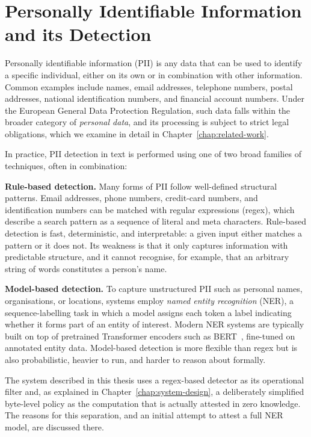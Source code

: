 \section{Personally Identifiable Information and its Detection}
\label{sec:bg-pii}

Personally identifiable information (PII) is any data that can be used to identify a specific individual, either on its own or in combination with other information. Common examples include names, email addresses, telephone numbers, postal addresses, national identification numbers, and financial account numbers. Under the European General Data Protection Regulation, such data falls within the broader category of \emph{personal data}, and its processing is subject to strict legal obligations, which we examine in detail in Chapter~\ref{chap:related-work}.

\medskip

In practice, PII detection in text is performed using one of two broad families of techniques, often in combination:

\medskip

\textbf{Rule-based detection.} Many forms of PII follow well-defined structural patterns. Email addresses, phone numbers, credit-card numbers, and identification numbers can be matched with regular expressions (regex), which describe a search pattern as a sequence of literal and meta characters. Rule-based detection is fast, deterministic, and interpretable: a given input either matches a pattern or it does not. Its weakness is that it only captures information with predictable structure, and it cannot recognise, for example, that an arbitrary string of words constitutes a person's name.

\medskip

\textbf{Model-based detection.} To capture unstructured PII such as personal names, organisations, or locations, systems employ \emph{named entity recognition} (NER), a sequence-labelling task in which a model assigns each token a label indicating whether it forms part of an entity of interest. Modern NER systems are typically built on top of pretrained Transformer encoders such as BERT~\cite{devlin2019bert}, fine-tuned on annotated entity data. Model-based detection is more flexible than regex but is also probabilistic, heavier to run, and harder to reason about formally.

\medskip

The system described in this thesis uses a regex-based detector as its operational filter and, as explained in Chapter~\ref{chap:system-design}, a deliberately simplified byte-level policy as the computation that is actually attested in zero knowledge. The reasons for this separation, and an initial attempt to attest a full NER model, are discussed there.

